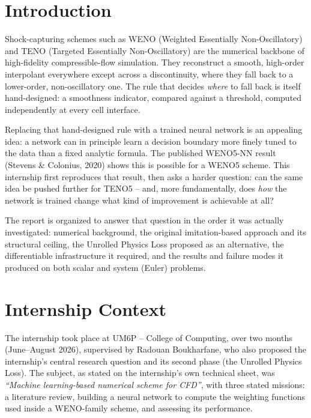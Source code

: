 \documentclass[11pt]{article}
\begin{document}
\section{Introduction}

Shock-capturing schemes such as WENO (Weighted Essentially Non-Oscillatory)
and TENO (Targeted Essentially Non-Oscillatory) are the numerical backbone
of high-fidelity compressible-flow simulation. They reconstruct a smooth,
high-order interpolant everywhere except across a discontinuity, where they
fall back to a lower-order, non-oscillatory one. The rule that decides
\emph{where} to fall back is itself hand-designed: a smoothness indicator,
compared against a threshold, computed independently at every cell
interface.

Replacing that hand-designed rule with a trained neural network is an
appealing idea: a network can in principle learn a decision boundary more
finely tuned to the data than a fixed analytic formula. The published
WENO5-NN result (Stevens \& Colonius, 2020) shows this is possible for a
WENO5 scheme. This internship first reproduces that result, then asks a
harder question: can the same idea be pushed further for TENO5 -- and, more
fundamentally, does \emph{how} the network is trained change what kind of
improvement is achievable at all?

The report is organized to answer that question in the order it was
actually investigated: numerical background, the original imitation-based
approach and its structural ceiling, the Unrolled Physics Loss proposed as
an alternative, the differentiable infrastructure it required, and the
results and failure modes it produced on both scalar and system (Euler)
problems.

\section{Internship Context}

The internship took place at UM6P -- College of Computing, over two months
(June--August 2026), supervised by Radouan Boukharfane, who also proposed
the internship's central research question and its second phase (the
Unrolled Physics Loss). The subject, as stated on the internship's own
technical sheet, was \emph{``Machine learning-based numerical scheme for
CFD''}, with three stated missions: a literature review, building a neural
network to compute the weighting functions used inside a WENO-family
scheme, and assessing its performance.
\end{document}
